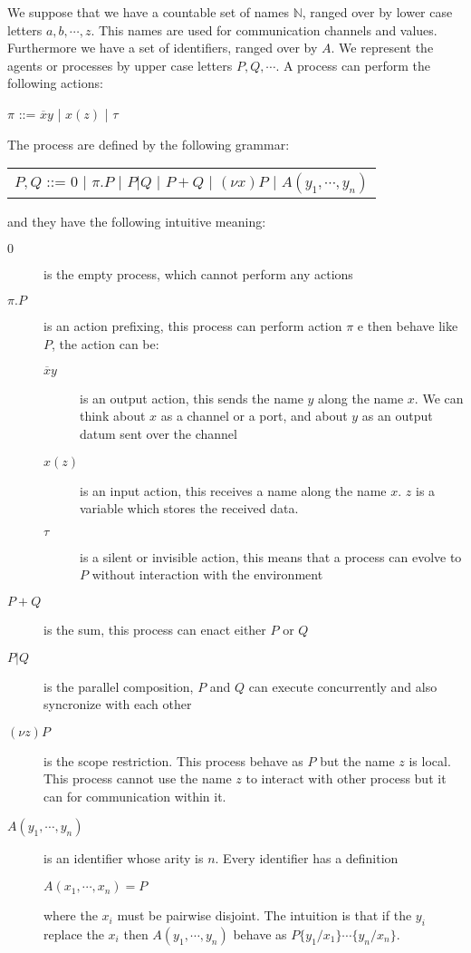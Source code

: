 We suppose that we have a countable set of names $\mathbb{N}$, ranged over by lower case letters $a,b, \cdots, z$. This names are used for communication channels and values. Furthermore we have a set of identifiers, ranged over by $A$. We represent the agents or processes by upper case letters $P,Q, \cdots $. A process can perform the following actions:
\begin{center}
  $\pi$ ::= $\overline{x}y$ | $x(z)$ | $\tau$ 
\end{center}
The process are defined by the following grammar:
\begin{center}
  \begin{tabular}{l}
    $P,Q$ ::= $0$ | $\pi.P$ | $P|Q$ | $P+Q$ | $(\nu x) P$ | $A(y_{1}, \cdots, y_{n})$ 
  \end{tabular}
\end{center}
and they have the following intuitive meaning:
\begin{description}
  \item[$0$] 
    is the empty process, which cannot perform any actions
  \item[$\pi.P$] 
    is an action prefixing, this process can perform action $\pi$ e then behave like $P$, the action can be:
    \begin{description}
      \item[$\overline{x}y$] 
	is an output action, this sends the name $y$ along the name $x$. We can think about $x$ as a channel or a port, and about $y$ as an output datum sent over the channel
      \item[$x(z)$] 
	is an input action, this receives a name along the name $x$. $z$ is a variable which stores the received data.
      \item[$\tau$] 
	is a silent or invisible action, this means that a process can evolve to $P$ without interaction with the environment 
    \end{description}
  \item[$P+Q$] 
    is the sum, this process can enact either $P$ or $Q$
  \item[$P|Q$] 
    is the parallel composition, $P$ and $Q$ can execute concurrently and also syncronize with each other
  \item[$(\nu z) P$] 
    is the scope restriction. This process behave as $P$ but the name $z$ is local. This process cannot use the name $z$ to interact with other process but it can for communication within it.
  \item[$A(y_{1}, \cdots, y_{n})$] 
    is an identifier whose arity is $n$. Every identifier has a definition
    \begin{center}
      $A(x_{1}, \cdots, x_{n}) = P$
    \end{center}
    where the $x_{i}$ must be pairwise disjoint. The intuition is that if the $y_{i}$ replace the $x_{i}$ then $A(y_{1}, \cdots, y_{n})$ behave as $P\{y_{1}/x_{1}\} \cdots \{y_{n}/x_{n}\}$. 
\end{description}

